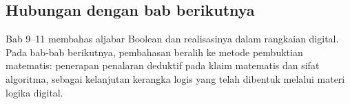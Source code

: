 \subsection{Hubungan dengan bab berikutnya}

Bab 9--11 membahas aljabar Boolean dan realisasinya dalam rangkaian digital. Pada bab-bab berikutnya, pembahasan beralih ke metode pembuktian matematis: penerapan penalaran deduktif pada klaim matematis dan sifat algoritma, sebagai kelanjutan kerangka logis yang telah dibentuk melalui materi logika digital.
